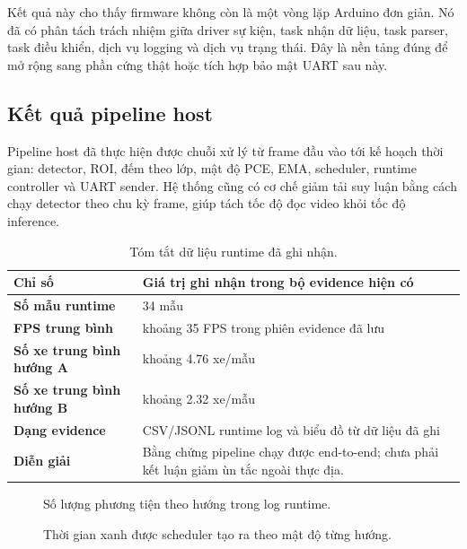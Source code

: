 Kết quả này cho thấy firmware không còn là một vòng lặp Arduino đơn giản. Nó đã có phân tách trách nhiệm giữa driver sự kiện, task nhận dữ liệu, task parser, task điều khiển, dịch vụ logging và dịch vụ trạng thái. Đây là nền tảng đúng để mở rộng sang phần cứng thật hoặc tích hợp bảo mật UART sau này.

\subsection{Kết quả pipeline host}

Pipeline host đã thực hiện được chuỗi xử lý từ frame đầu vào tới kế hoạch thời gian: detector, ROI, đếm theo lớp, mật độ PCE, EMA, scheduler, runtime controller và UART sender. Hệ thống cũng có cơ chế giảm tải suy luận bằng cách chạy detector theo chu kỳ frame, giúp tách tốc độ đọc video khỏi tốc độ inference.

\begin{table}[H]
\centering
\caption{Tóm tắt dữ liệu runtime đã ghi nhận.}
\label{tab:runtime-summary}
\small
\begin{tabularx}{\linewidth}{>{\bfseries}p{4.0cm}Y}
\toprule
Chỉ số & Giá trị ghi nhận trong bộ evidence hiện có \\
\midrule
Số mẫu runtime & 34 mẫu \\
FPS trung bình & khoảng 35 FPS trong phiên evidence đã lưu \\
Số xe trung bình hướng A & khoảng 4.76 xe/mẫu \\
Số xe trung bình hướng B & khoảng 2.32 xe/mẫu \\
Dạng evidence & CSV/JSONL runtime log và biểu đồ từ dữ liệu đã ghi \\
Diễn giải & Bằng chứng pipeline chạy được end-to-end; chưa phải kết luận giảm ùn tắc ngoài thực địa. \\
\bottomrule
\end{tabularx}
\normalsize
\end{table}

\begin{figure}[H]
  \centering
  \caption{Số lượng phương tiện theo hướng trong log runtime.}
  \label{fig:direction-counts}
\end{figure}

\begin{figure}[H]
  \centering
  \caption{Thời gian xanh được scheduler tạo ra theo mật độ từng hướng.}
  \label{fig:green-times}
\end{figure}


